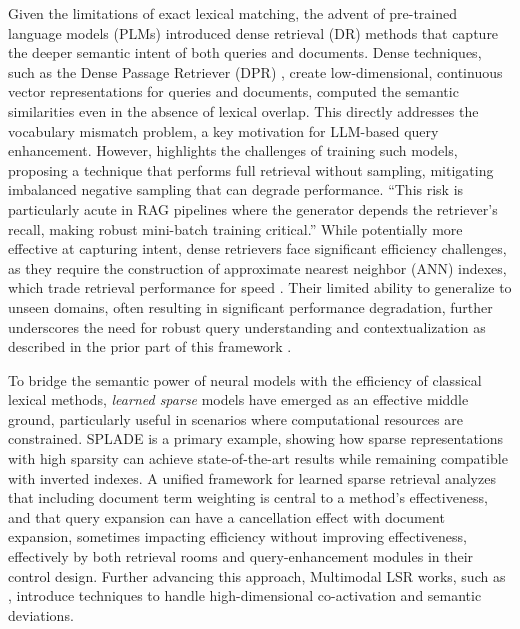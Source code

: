 \documentclass[11pt]{article}
\begin{document}
Given the limitations of exact lexical matching, the advent of pre-trained language models (PLMs) introduced dense retrieval (DR) methods that capture the deeper semantic intent of both queries and documents. Dense techniques, such as the Dense Passage Retriever (DPR) \cite{ref76}, create low-dimensional, continuous vector representations for queries and documents, computed the semantic similarities even in the absence of lexical overlap. This directly addresses the vocabulary mismatch problem, a key motivation for LLM-based query enhancement. However, \cite{ref77} highlights the challenges of training such models, proposing a technique that performs full retrieval without sampling, mitigating imbalanced negative sampling that can degrade performance. ``This risk is particularly acute in RAG pipelines where the generator depends the retriever's recall, making robust mini-batch training critical.'' While potentially more effective at capturing intent, dense retrievers face significant efficiency challenges, as they require the construction of approximate nearest neighbor (ANN) indexes, which trade retrieval performance for speed \cite{ref78}. Their limited ability to generalize to unseen domains, often resulting in significant performance degradation, further underscores the need for robust query understanding and contextualization as described in the prior part of this framework \cite{ref79}.

To bridge the semantic power of neural models with the efficiency of classical lexical methods, \emph{learned sparse} models have emerged as an effective middle ground, particularly useful in scenarios where computational resources are constrained. SPLADE \cite{ref80} is a primary example, showing how sparse representations with high sparsity can achieve state-of-the-art results while remaining compatible with inverted indexes. A unified framework for learned sparse retrieval \cite{ref81} analyzes that including document term weighting is central to a method's effectiveness, and that query expansion can have a cancellation effect with document expansion, sometimes impacting efficiency without improving effectiveness, effectively by both retrieval rooms and query-enhancement modules in their control design. Further advancing this approach, Multimodal LSR works, such as \cite{ref82}, introduce techniques to handle high-dimensional co-activation and semantic deviations.
\end{document}

